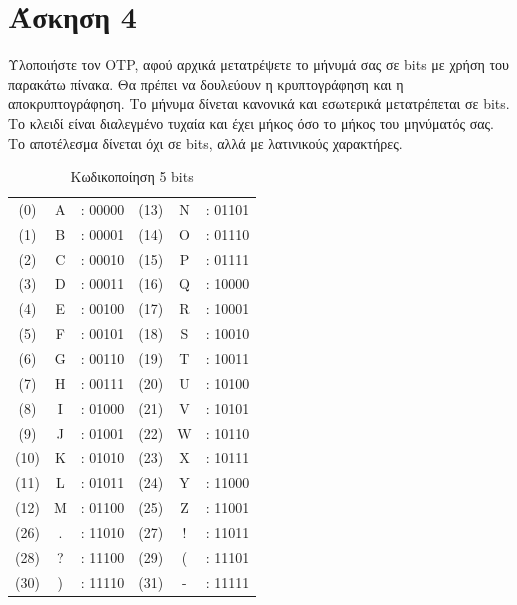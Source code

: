 \documentclass[12pt]{article}
\begin{document}
\section*{Άσκηση 4}
Υλοποιήστε τον OTP, αφού αρχικά μετατρέψετε το μήνυμά σας σε bits με χρήση του παρακάτω πίνακα. Θα πρέπει να δουλεύουν η κρυπτογράφηση και η αποκρυπτογράφηση. Το μήνυμα δίνεται κανονικά και εσωτερικά μετατρέπεται σε bits. Το κλειδί είναι διαλεγμένο τυχαία και έχει μήκος όσο το μήκος του μηνύματός σας. Το αποτέλεσμα δίνεται όχι σε bits, αλλά με λατινικούς χαρακτήρες.
\begin{table}[h]
    \centering
    \renewcommand{\arraystretch}{1.3}
    \caption{Κωδικοποίηση 5 bits}
    \label{πίνακας 1}
    \begin{tabular}{|c c c|c c c|}
        \hline
        (0) & A  & : 00000  & (13) & N  & : 01101  \\
        (1) & B  & : 00001  & (14) & O  & : 01110  \\
        (2) & C  & : 00010  & (15) & P  & : 01111  \\
        (3) & D  & : 00011  & (16) & Q  & : 10000  \\
        (4) & E  & : 00100  & (17) & R  & : 10001  \\
        (5) & F  & : 00101  & (18) & S  & : 10010  \\
        (6) & G  & : 00110  & (19) & T  & : 10011  \\
        (7) & H  & : 00111  & (20) & U  & : 10100  \\
        (8) & I  & : 01000  & (21) & V  & : 10101  \\
        (9) & J  & : 01001  & (22) & W  & : 10110  \\
        (10) & K  & : 01010  & (23) & X  & : 10111  \\
        (11) & L  & : 01011  & (24) & Y  & : 11000  \\
        (12) & M  & : 01100  & (25) & Z  & : 11001  \\
        (26) & .  & : 11010  & (27) & !  & : 11011  \\
        (28) & ?  & : 11100  & (29) & (  & : 11101  \\
        (30) & )  & : 11110  & (31) & -  & : 11111  \\
        \hline
    \end{tabular}
\end{table}
\end{document}
